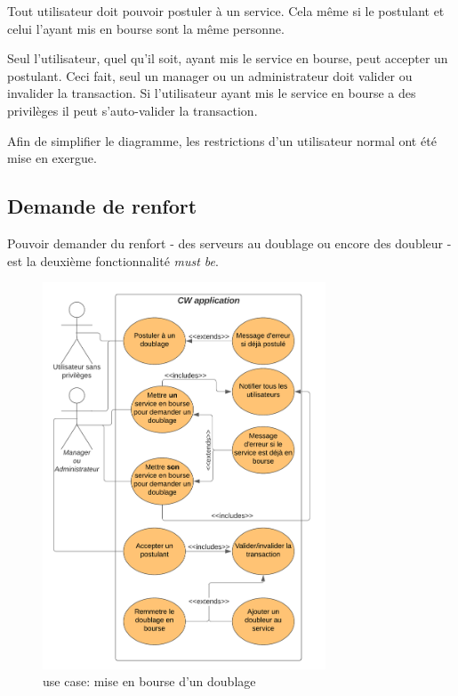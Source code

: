 Tout utilisateur doit pouvoir postuler à un service. Cela même si le postulant et celui l'ayant mis en bourse sont la même personne.

Seul l'utilisateur, quel qu'il soit, ayant mis le service en bourse, peut accepter un postulant. Ceci fait, seul un manager ou un administrateur doit valider ou invalider la transaction. Si l'utilisateur ayant mis le service en bourse a des privilèges il peut s'auto-valider la transaction.

Afin de simplifier le diagramme, les restrictions d'un utilisateur normal ont été mise en exergue.

\subsection*{Demande de renfort}

Pouvoir demander du renfort - des serveurs au doublage ou encore des doubleur - est la deuxième fonctionnalité \textit{must be}. 
\begin{figure}[!h]
    \begin{center}
        \includegraphics[width= 0.75\textwidth]{uses cases/doublageUC.png}
    \end{center}
    \caption{use case: mise en bourse d'un doublage}
\end{figure}

